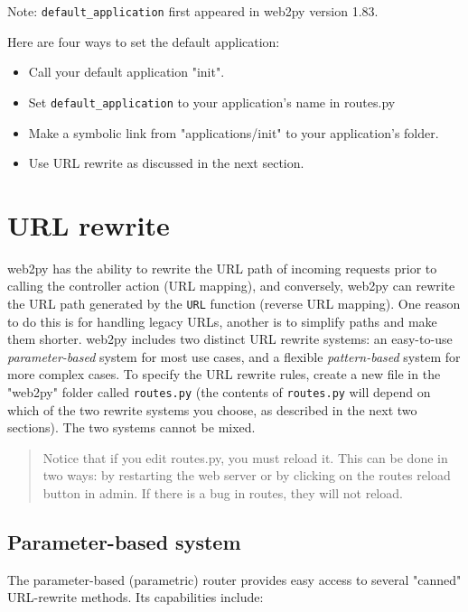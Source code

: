 \documentclass[justified,sixbynine,notoc]{tufte-book}
\def\ft{\small\tt}
\def\inxx#1{\index{#1}}
\begin{document}
\begin{fullwidth}
Note: {\ft default\_application} first appeared in web2py version 1.83.

Here are four ways to set the default application:
\begin{itemize}
\item Call your default application "init".

\item Set {\ft default\_application} to your application's name in routes.py

\item Make a symbolic link from "applications/init" to your application's folder.

\item Use URL rewrite as discussed in the next section.
\end{itemize}

\goodbreak\section{URL rewrite}

\inxx{url rewrite}
\inxx{routes\_in}
\inxx{routes\_out}
\noindent web2py has the ability to rewrite the URL path of incoming requests prior to calling the controller action (URL mapping), and conversely, web2py can rewrite the URL path generated by the {\ft URL} function (reverse URL mapping). One reason to do this is for handling legacy URLs, another is to simplify paths and make them shorter.
\noindent web2py includes two distinct URL rewrite systems: an easy-to-use {\it parameter-based} system for most use cases, and a flexible {\it pattern-based} system for more complex cases. To specify the URL rewrite rules, create a new file in the "web2py" folder called {\ft routes.py} (the contents of {\ft routes.py} will depend on which of the two rewrite systems you choose, as described in the next two sections). The two systems cannot be mixed.

\begin{quote}Notice that if you edit routes.py, you must reload it. This can be done in two ways: by restarting the web server or by clicking on the routes reload button in admin. If there is a bug in routes, they will not reload.\end{quote}
\goodbreak\subsection{Parameter-based system}

The parameter-based (parametric) router provides easy access to several "canned" URL-rewrite methods. Its capabilities include:


\end{fullwidth}
\end{document}
